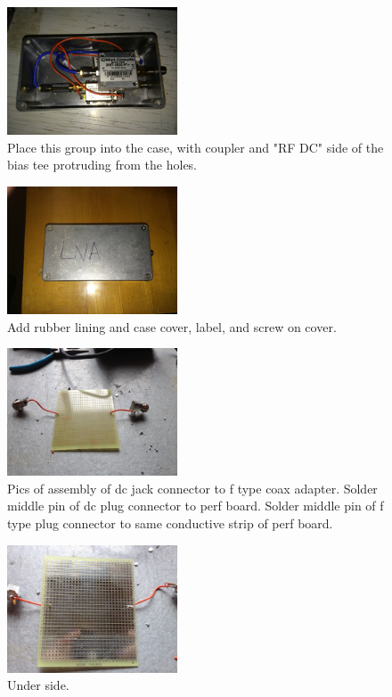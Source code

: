 \documentclass[11pt]{article} %
\begin{document}
\begin{figure}
  \centering
  \caption{Place this group into the case, with coupler and "RF DC" side of the bias tee protruding from the holes. }
  \includegraphics[width=0.45\textwidth]{lna/06.jpeg}
\end{figure}


\begin{figure}
  \centering
  \caption{Add rubber lining and case cover, label, and screw on cover.}
  \includegraphics[width=0.45\textwidth]{lna/07.jpeg}
\end{figure}


\begin{figure}
  \centering
  \caption{Pics of assembly of dc jack connector to f type coax adapter. Solder middle pin of dc plug connector to perf board. Solder middle pin of f type plug connector to same conductive strip of perf board. }
  \includegraphics[width=0.45\textwidth]{lna/08.jpeg}
\end{figure}


\begin{figure}
  \centering
  \caption{Under side. }
  \includegraphics[width=0.45\textwidth]{lna/09.jpeg}
\end{figure}
\end{document}
